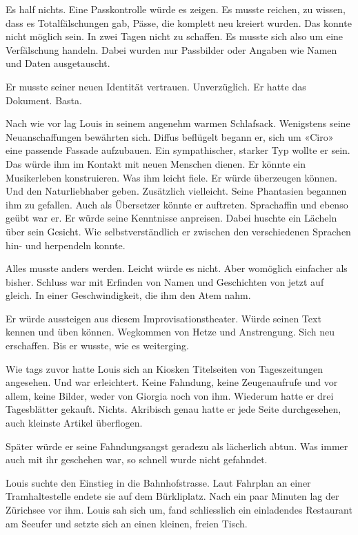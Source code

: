 Es half nichts. Eine Passkontrolle würde es zeigen. Es musste reichen,
zu wissen, dass es Totalfälschungen gab, Pässe, die komplett neu kreiert
wurden. Das konnte nicht möglich sein. In zwei Tagen nicht zu schaffen.
Es musste sich also um eine Verfälschung handeln. Dabei wurden nur
Passbilder oder Angaben wie Namen und Daten ausgetauscht.

Er musste seiner neuen Identität vertrauen. Unverzüglich. Er hatte das
Dokument. Basta.

Nach wie vor lag Louis in seinem angenehm warmen Schlafsack. Wenigstens
seine Neuanschaffungen bewährten sich. Diffus beflügelt begann er, sich
um «Ciro» eine passende Fassade aufzubauen. Ein sympathischer, starker
Typ wollte er sein. Das würde ihm im Kontakt mit neuen Menschen dienen.
Er könnte ein Musikerleben konstruieren. Was ihm leicht fiele. Er würde
überzeugen können. Und den Naturliebhaber geben. Zusätzlich vielleicht.
Seine Phantasien begannen ihm zu gefallen. Auch als Übersetzer könnte er
auftreten. Sprachaffin und ebenso geübt war er. Er würde seine
Kenntnisse anpreisen. Dabei huschte ein Lächeln über sein Gesicht. Wie
selbstverständlich er zwischen den verschiedenen Sprachen hin- und
herpendeln konnte.

Alles musste anders werden. Leicht würde es nicht. Aber womöglich
einfacher als bisher. Schluss war mit Erfinden von Namen und Geschichten
von jetzt auf gleich. In einer Geschwindigkeit, die ihm den Atem nahm.

Er würde aussteigen aus diesem Improvisationstheater. Würde seinen Text
kennen und üben können. Wegkommen von Hetze und Anstrengung. Sich neu
erschaffen. Bis er wusste, wie es weiterging.

Wie tags zuvor hatte Louis sich an Kiosken Titelseiten von
Tageszeitungen angesehen. Und war erleichtert. Keine Fahndung, keine
Zeugenaufrufe und vor allem, keine Bilder, weder von Giorgia noch von
ihm. Wiederum hatte er drei Tagesblätter gekauft. Nichts. Akribisch
genau hatte er jede Seite durchgesehen, auch kleinste Artikel
überflogen.

Später würde er seine Fahndungsangst geradezu als lächerlich abtun. Was
immer auch mit ihr geschehen war, so schnell wurde nicht gefahndet.

Louis suchte den Einstieg in die Bahnhofstrasse. Laut Fahrplan an einer
Tramhaltestelle endete sie auf dem Bürkliplatz. Nach ein paar Minuten
lag der Zürichsee vor ihm. Louis sah sich um, fand schliesslich ein
einladendes Restaurant am Seeufer und setzte sich an einen kleinen,
freien Tisch.

